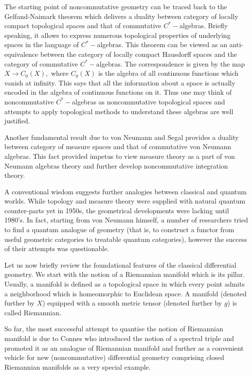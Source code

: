 \documentclass{article}
\begin{document}
The starting point of noncommutative geometry can be traced back to the Gelfand-Naimark theorem which delivers a duality between category of locally compact topological spaces and that of commutative $C^{\ast}-$algebras. Briefly speaking, it allows to express numerous topological properties of underlying spaces in the language of $C^{\ast}-$algebras. This   theorem can be viewed as an anti-equivalence between the category of locally compact Hausdorff spaces and the category of commutative $C^{\ast}-$algebras. The correspondence is given by the map $X\to C_0(X),$ where $C_0(X)$ is the algebra of all continuous functions which vanish at infinity. This says that all the information about a space is actually encoded in the algebra of continuous functions on it. Thus one may think of noncommutative $C^{\ast}-$algebras as noncommutative topological spaces and attempts to apply topological methods to understand these algebras are well justified. 

Another fundamental result due to von Neumann and Segal provides a duality between category of measure spaces and that of commutative von Neumann algebras. This fact provided impetus to view measure theory as a part of von Neumann algebras theory and further develop noncommutative integration theory.

A conventional wisdom suggests further analogies between classical and quantum worlds.  While topology and measure theory were supplied with natural quantum counter-parts yet in 1950s, the geometrical developments were lacking until 1980's. In fact, starting from von Neumann himself, a number of researchers tried to find a quantum analogue of geometry (that is, to construct a functor from useful geometric categories to treatable quantum categories), however the success of their attempts was questionable.

Let us now briefly review the foundational features of the classical differential geometry. We start with the notion of a Riemannian manifold which is its pillar. Usually, a manifold is defined as a topological space in which every point admits a neighborhood which is homeomorphic to Euclidean space. A manifold (denoted further by $X$) equipped with a smooth metric tensor (denoted further by $g$) is called Riemannian.

So far, the most successful attempt to quantise the notion of Riemannian manifold is due to Connes who introduced the notion of a spectral triple and promoted it as an analogue of Riemannian manifold and further as a convenient vehicle for new (noncommutative) differential geometry comprising closed Riemannian manifolds as a very special example.  
\end{document}
